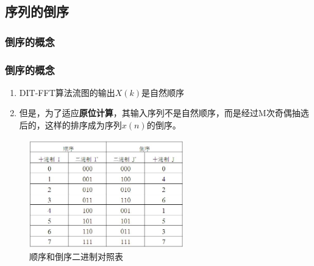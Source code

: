 \documentclass[notheorems,compress,mathserif,table]{beamer}
\begin{document}
\subsection{序列的倒序}
\subsubsection{倒序的概念}
\begin{frame}[shrink]\frametitle{倒序的概念}
\begin{enumerate}
  \item DIT-FFT算法流图的输出$X(k)$是自然顺序
  \item 但是，为了适应\textbf{原位计算}，其输入序列不是自然顺序，而是经过M次奇偶抽选后的，这样的排序成为序列$x(n)$的倒序。
\end{enumerate}

\begin{figure}[h]
  \centering
  \includegraphics[width=0.6\textwidth]{daoxun.jpg}
  \caption{顺序和倒序二进制对照表}
\end{figure}
\end{frame}
\end{document}
